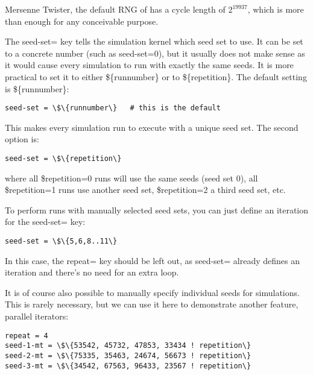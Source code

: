 \begin{note}
Mersenne Twister, the default RNG of {\opp} has a cycle length of
$2^{19937}$, which is more than enough for any conceivable purpose.
\end{note}

The seed-set= key tells the simulation kernel which seed set to use.
It can be set to a concrete number (such as seed-set=0), but it
usually does not make sense as it would cause every simulation to run
with exactly the same seeds. It is more practical to set it to either
\$\{runnumber\} or to \$\{repetition\}. The default setting is
\$\{runnumber\}:

\begin{Verbatim}[commandchars=\\\{\}]
seed-set = \$\{runnumber\}   # this is the default
\end{Verbatim}

This makes every simulation run to execute with a unique seed set. The
second option is:

\begin{Verbatim}[commandchars=\\\{\}]
seed-set = \$\{repetition\}
\end{Verbatim}

where all \$repetition=0 runs will use the same seeds (seed set 0), all
\$repetition=1 runs use another seed set, \$repetition=2 a third seed
set, etc.

To perform runs with manually selected seed sets, you can just define an
iteration for the seed-set= key:

\begin{Verbatim}[commandchars=\\\{\}]
seed-set = \$\{5,6,8..11\}
\end{Verbatim}

In this case, the repeat= key should be left out, as seed-set= already
defines an iteration and there's no need for an extra
loop.

It is of course also possible to manually specify individual seeds for
simulations. This is rarely necessary, but we can use it here to
demonstrate another feature, parallel iterators:

\begin{Verbatim}[commandchars=\\\{\}]
repeat = 4
seed-1-mt = \$\{53542, 45732, 47853, 33434 ! repetition\}
seed-2-mt = \$\{75335, 35463, 24674, 56673 ! repetition\}
seed-3-mt = \$\{34542, 67563, 96433, 23567 ! repetition\}
\end{Verbatim}

